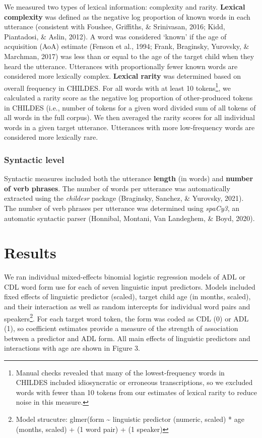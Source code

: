 \documentclass[10pt, letterpaper]{article}
\begin{document}
We measured two types of lexical information: complexity and rarity.
\textbf{Lexical complexity} was defined as the negative log proportion
of known words in each utterance (consistent with Foushee, Griffiths, \&
Srinivasan, 2016; Kidd, Piantadosi, \& Aslin, 2012). A word was
considered `known' if the age of acquisition (AoA) estimate (Fenson et
al., 1994; Frank, Braginsky, Yurovsky, \& Marchman, 2017) was less than
or equal to the age of the target child when they heard the utterance.
Utterances with proportionally fewer known words are considered more
lexically complex. \textbf{Lexical rarity} was determined based on
overall frequency in CHILDES. For all words with at least 10
tokens\footnote{Manual checks revealed that many of the lowest-frequency
  words in CHILDES included idiosyncratic or erroneous transcriptions,
  so we excluded words with fewer than 10 tokens from our estimates of
  lexical rarity to reduce noise in this measure.}, we calculated a
rarity score as the negative log proportion of other-produced tokens in
CHILDES (i.e., number of tokens for a given word divided sum of all
tokens of all words in the full corpus). We then averaged the rarity
scores for all individual words in a given target utterance. Utterances
with more low-frequency words are considered more lexically rare.

\hypertarget{syntactic-level}{%
\subsubsection{Syntactic level}\label{syntactic-level}}

Syntactic measures included both the utterance \textbf{length} (in
words) and \textbf{number of verb phrases}. The number of words per
utterance was automatically extracted using the \emph{childesr} package
(Braginsky, Sanchez, \& Yurovsky, 2021). The number of verb phrases per
utterance was determined using \emph{spaCy3}, an automatic syntactic
parser (Honnibal, Montani, Van Landeghem, \& Boyd, 2020).

\hypertarget{results-1}{%
\section{Results}\label{results-1}}

We ran individual mixed-effects binomial logistic regression models of
ADL or CDL word form use for each of seven linguistic input predictors.
Models included fixed effects of linguistic predictor (scaled), target
child age (in months, scaled), and their interaction as well as random
intercepts for individual word pairs and speakers\footnote{Model
  strucutre: glmer(form \textasciitilde{} linguistic predictor (numeric,
  scaled) * age (months, scaled) + (1 \textbar{} word pair) + (1
  \textbar{} speaker)}. For each target word token, the form was coded
as CDL (0) or ADL (1), so coefficient estimates provide a measure of the
strength of association between a predictor and ADL form. All main
effects of linguistic predictors and interactions with age are shown in
Figure 3.
\end{document}
